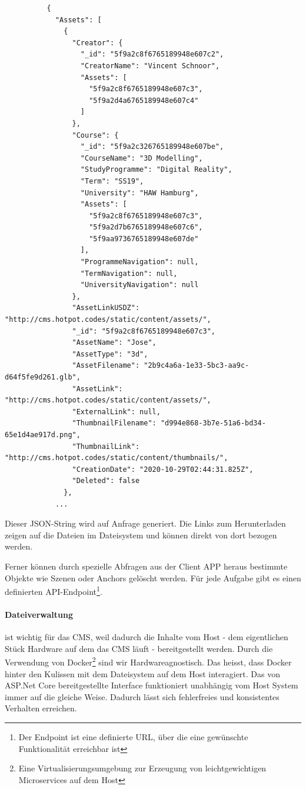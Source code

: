 \documentclass[titlepage, a4paper, 11pt]{scrartcl}
\begin{document}
        \begin{lstlisting}          
          {
            "Assets": [
              {
                "Creator": {
                  "_id": "5f9a2c8f6765189948e607c2",
                  "CreatorName": "Vincent Schnoor",
                  "Assets": [
                    "5f9a2c8f6765189948e607c3",
                    "5f9a2d4a6765189948e607c4"
                  ]
                },
                "Course": {
                  "_id": "5f9a2c326765189948e607be",
                  "CourseName": "3D Modelling",
                  "StudyProgramme": "Digital Reality",
                  "Term": "SS19",
                  "University": "HAW Hamburg",
                  "Assets": [
                    "5f9a2c8f6765189948e607c3",
                    "5f9a2d7b6765189948e607c6",
                    "5f9aa9736765189948e607de"
                  ],
                  "ProgrammeNavigation": null,
                  "TermNavigation": null,
                  "UniversityNavigation": null
                },
                "AssetLinkUSDZ": "http://cms.hotpot.codes/static/content/assets/",
                "_id": "5f9a2c8f6765189948e607c3",
                "AssetName": "Jose",
                "AssetType": "3d",
                "AssetFilename": "2b9c4a6a-1e33-5bc3-aa9c-d64f5fe9d261.glb",
                "AssetLink": "http://cms.hotpot.codes/static/content/assets/",
                "ExternalLink": null,
                "ThumbnailFilename": "d994e868-3b7e-51a6-bd34-65e1d4ae917d.png",
                "ThumbnailLink": "http://cms.hotpot.codes/static/content/thumbnails/",
                "CreationDate": "2020-10-29T02:44:31.825Z",
                "Deleted": false
              },
            ...
        \end{lstlisting}    
        
        Dieser JSON-String wird auf Anfrage generiert. Die Links zum Herunterladen zeigen auf die Dateien im Dateisystem und können direkt von dort bezogen werden.

        Ferner können durch spezielle Abfragen aus der Client APP heraus bestimmte Objekte wie Szenen oder Anchors gelöscht werden. 
        Für jede Aufgabe gibt es einen definierten API-Endpoint\footnote{Der Endpoint ist eine definierte URL, über die eine gewünschte Funktionalität erreichbar ist}.

        \paragraph{Dateiverwaltung} ist wichtig für das CMS, weil dadurch die Inhalte vom Host - dem eigentlichen Stück Hardware auf dem das CMS läuft - bereitgestellt werden.
        Durch die Verwendung von Docker\footnote{Eine Virtualisierungsumgebung zur Erzeugung von leichtgewichtigen Microservices auf dem Host} sind wir Hardwareagnostisch.
        Das heisst, dass Docker hinter den Kulissen mit dem Dateisystem auf dem Host interagiert. Das von ASP.Net Core bereitgestellte Interface funktioniert unabhängig
        vom Host System immer auf die gleiche Weise. Dadurch lässt sich fehlerfreies und konsistentes Verhalten erreichen.
\end{document}
